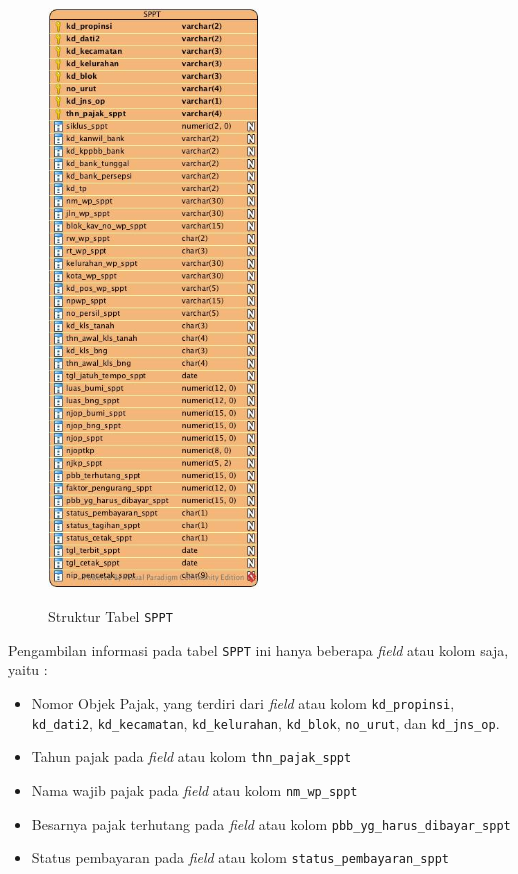\begin{figure}[H]
	\centering
	\includegraphics[width=0.5\textwidth]{./resources/struktur-tabel-sppt}
	\label{fig:struktur-tabel-sppt}
	\caption{Struktur Tabel \texttt{SPPT}}
\end{figure}

Pengambilan informasi pada tabel \texttt{SPPT} ini hanya beberapa \textit{field} atau kolom saja, yaitu :

\begin{itemize}
	\item Nomor Objek Pajak, yang terdiri dari \textit{field} atau kolom \texttt{kd\_propinsi}, \texttt{kd\_dati2}, \texttt{kd\_kecamatan}, \texttt{kd\_kelurahan}, \texttt{kd\_blok}, \texttt{no\_urut}, dan \texttt{kd\_jns\_op}.
	\item Tahun pajak pada \textit{field} atau kolom \texttt{thn\_pajak\_sppt}
	\item Nama wajib pajak pada \textit{field} atau kolom \texttt{nm\_wp\_sppt}
	\item Besarnya pajak terhutang pada \textit{field} atau kolom \texttt{pbb\_yg\_harus\_dibayar\_sppt}
	\item Status pembayaran pada \textit{field} atau kolom \texttt{status\_pembayaran\_sppt}
\end{itemize}

